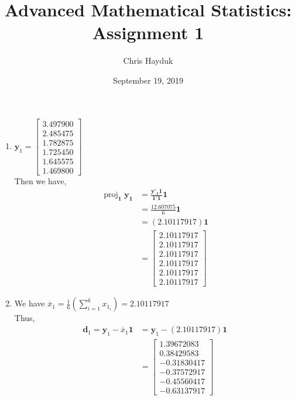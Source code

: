 \documentclass[12pt]{article}
\newenvironment{problem}[2][Problem]{\begin{trivlist}
\item[\hskip \labelsep {\bfseries #1}\hskip \labelsep {\bfseries #2.}]}{\end{trivlist}}
\DeclareMathOperator{\proj}{proj}
\newcommand{\vct}{\mathbf}
\newcommand{\vctproj}[2][]{\proj_{\vct{#1}}\vct{#2}}
\begin{document}
\title{Advanced Mathematical Statistics: Assignment 1}

\author{Chris Hayduk}
\date{September 19, 2019}

\maketitle

\begin{problem}{3.4}
\end{problem}

\begin{enumerate}[label=\alph*)]
	\item $\vct{y}_1 = \begin{bmatrix}
           3.497900 \\
           2.485475 \\
           1.782875 \\
           1.725450 \\
           1.645575 \\
           1.469800
         \end{bmatrix}$\\
         
         Then we have,
         \begin{align*}
         	\vctproj[1]{y_1} &= \frac{\vct{y'_1}\vct{1}}{\vct{1}'\vct{1}}\vct{1}\\
         	&= \frac{12.607075}{6}\vct{1}\\
         	&= (2.10117917)\vct{1}\\
         	&= \begin{bmatrix}
           2.10117917 \\
           2.10117917 \\
           2.10117917 \\
           2.10117917 \\
           2.10117917 \\
           2.10117917
         \end{bmatrix}
         \end{align*}
         
	\item We have $\overline{x}_1 = \frac{1}{6}(\sum_{i = 1}^{6} x_{1_i}) = 2.10117917$\\
	
		 Thus,
		  \begin{align*}
			\vct{d}_1 = \vct{y}_1 - \overline{x}_1\vct{1} &= \vct{y}_1 - (2.10117917)\vct{1}\\
			&= \begin{bmatrix}
           1.39672083 \\
           0.38429583 \\
           -0.31830417 \\
           -0.37572917 \\
           -0.45560417 \\
           -0.63137917
           \end{bmatrix}
		  \end{align*}
		  

\end{enumerate}
\end{document}
